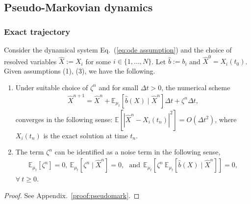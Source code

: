 \documentclass[11pt, a4paper, oneside, reqno]{amsart}
\begin{document}
\subsection{Pseudo-Markovian dynamics}
\subsubsection{Exact trajectory}
\begin{theorem}\label{thm:pseudo-mark}
    Consider the dynamical system Eq.~(\ref{eq:ode assumption}) and the choice of resolved variables $\hat{X}:=X_i$ for some $i\in \{1,...,N\}$. Let $\hat{b}:=b_i$ and $\hat{X}^0=X_i(t_0)$. Given assumptions (1), (3), we have the following.
    \begin{enumerate}
        \item Under suitable choice of $\zeta^n$ and for small $\Delta t>0$, the numerical scheme 
        \begin{eqnarray}\label{eq:scheme proposition}
            \hat{X}^{n+1} = \hat{X}^{n} +  \mathbb{E}_{\mu_t}[\hat{b}(X)\mid\hat{X}^n]\Delta t  + \zeta^n\Delta t, 
        \end{eqnarray}
        converges in the following sense: $\mathbb{E}[|\hat{X}^{n}-X_i(t_n)|^2]=O(\Delta t^2)$, where $X_i(t_n)$ is the exact solution at time $t_n$.
        \item The term $\zeta^n$ can be identified as a noise term in the following sense,
        \begin{eqnarray}
        \label{eq:noise-iden}
            \mathbb{E}_{\mu_t}[\zeta^n] = 0, \ 
            \mathbb{E}_{\mu_t}[\zeta^n\mid\hat{X}^n] = 0, \ \ \ \textrm{and} \ \ 
            \mathbb{E}_{\mu_t}\left[\zeta^n\:\mathbb{E}_{\mu_t}[\hat{b}(X)\mid\hat{X}^n]\right] = 0,
        \end{eqnarray}
        $\forall \:t\geq 0$.
    \end{enumerate}
\end{theorem}
\begin{proof}
    See Appendix.~\ref{proof:pseudomark}.
\end{proof}
\end{document}
